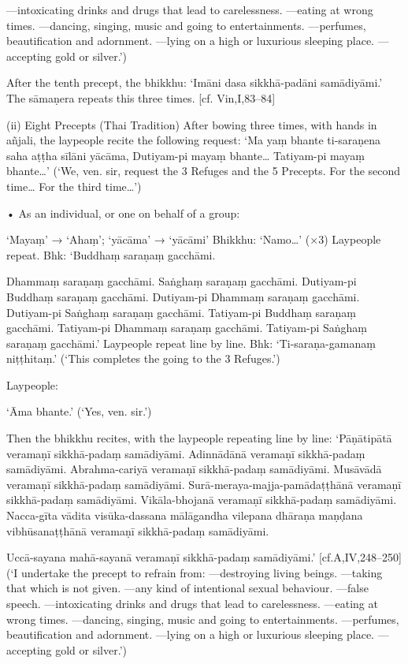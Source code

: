 —intoxicating drinks and drugs that lead to
carelessness.
—eating at wrong times.
—dancing, singing, music and going to
entertainments.
—perfumes, beautification and adornment.
—lying on a high or luxurious sleeping place.
—accepting gold or silver.’)

After the tenth precept, the bhikkhu:
‘Imāni dasa sikkhā-padāni samādiyāmi.’
The sāmaṇera repeats this three times.
[cf. Vin,I,83–84]

(ii) Eight Precepts (Thai Tradition)
After bowing three times, with hands in
añjali, the laypeople recite the following
request:
‘Ma yaṃ bhante ti-saraṇena saha
aṭṭha sīlāni yācāma,
Dutiyam-pi mayaṃ bhante…
Tatiyam-pi mayaṃ bhante…’
(‘We, ven. sir, request the 3 Refuges and the 5
Precepts. For the second time… For the third time…’)

• As an individual, or one on behalf of a group:

‘Mayaṃ’ → ‘Ahaṃ’; ‘yācāma’ → ‘yācāmi’
Bhikkhu:
‘Namo…’ (×3)
Laypeople repeat.
Bhk: ‘Buddhaṃ saraṇaṃ gacchāmi.

Dhammaṃ saraṇaṃ gacchāmi.
Saṅghaṃ saraṇaṃ gacchāmi.
Dutiyam-pi Buddhaṃ saraṇaṃ gacchāmi.
Dutiyam-pi Dhammaṃ saraṇaṃ gacchāmi.
Dutiyam-pi Saṅghaṃ saraṇaṃ gacchāmi.
Tatiyam-pi Buddhaṃ saraṇaṃ gacchāmi.
Tatiyam-pi Dhammaṃ saraṇaṃ gacchāmi.
Tatiyam-pi Saṅghaṃ saraṇaṃ gacchāmi.’
Laypeople repeat line by line.
Bhk: ‘Ti-saraṇa-gamanaṃ niṭṭhitaṃ.’
(‘This completes the going to the 3 Refuges.’)

Laypeople:

‘Āma bhante.’
(‘Yes, ven. sir.’)

Then the bhikkhu recites, with the laypeople
repeating line by line:
‘Pāṇātipātā veramaṇī sikkhā-padaṃ samādiyāmi.
Adinnādānā veramaṇī sikkhā-padaṃ samādiyāmi.
Abrahma-cariyā veramaṇī sikkhā-padaṃ
samādiyāmi.
Musāvādā veramaṇī sikkhā-padaṃ samādiyāmi.
Surā-meraya-majja-pamādaṭṭhānā veramaṇī
sikkhā-padaṃ samādiyāmi.
Vikāla-bhojanā veramaṇī sikkhā-padaṃ
samādiyāmi.
Nacca-gīta vādita visūka-dassana mālāgandha vilepana dhāraṇa maṇḍana
vibhūsanaṭṭhānā veramaṇī sikkhā-padaṃ
samādiyāmi.

Uccā-sayana mahā-sayanā veramaṇī
sikkhā-padaṃ samādiyāmi.’
[cf.A,IV,248–250]
(‘I undertake the precept to refrain from:
—destroying living beings.
—taking that which is not given.
—any kind of intentional sexual behaviour.
—false speech.
—intoxicating drinks and drugs that lead to
carelessness.
—eating at wrong times.
—dancing, singing, music and going to
entertainments.
—perfumes, beautification and adornment.
—lying on a high or luxurious sleeping place.
—accepting gold or silver.’)

